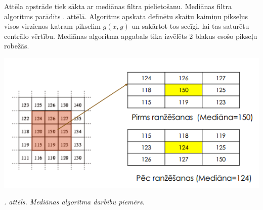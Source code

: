 \documentclass[12pt, a4paper, oneside, openright]{article}
\renewcommand{\thecimages}{\arabic{cimages}}
\begin{document}
\par
Attēla apstrāde tiek sākta ar mediānas filtra pielietošanu. Mediānas filtra algoritms parādīts . attēlā. 
Algoritms apskata definētu skaitu kaimiņu pikseļus visos virzienos katram pikselim $g(x,y)$ un sakārtot tos secīgi, lai tas saturētu centrālo vērtību.
Mediānas algoritma apgabals tika izvēlēts 2 blakus esošo pikseļu robežās.

\label{cimages:4_a1}
\vspace{10pt}
\begin{center}
\includegraphics[width=0.6\columnwidth]{images/4_a1.png}
\begin{center}
\footnotesize{
\textit{\thecimages. attēls. Mediānas algoritma darbību piemērs.}}
\end{center}
\end{center}
\end{document}
